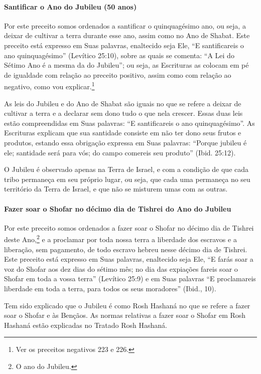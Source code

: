 \paragraph{Santificar o Ano do Jubileu (50 anos)}

Por este preceito somos ordenados a santificar o quinquagésimo ano, ou
seja, a deixar de cultivar a terra durante esse ano, assim como no Ano
de Shabat. Este preceito está expresso em Suas palavras, enaltecido seja
Ele, ``E santificareis o ano quinquagésimo'' (Levítico 25:10), sobre as
quais se comenta: ``A Lei do Sétimo Ano é a mesma da do Jubileu''; ou
seja, as Escrituras as colocam em pé de igualdade com relação ao preceito positivo, assim como com relação ao negativo, como vou explicar.\footnote{Ver os preceitos negativos 223 e 226.}

As leis do Jubileu e do Ano de Shabat são iguais no que se refere a
deixar de cultivar a terra e a declarar sem dono tudo o que nela crescer. Essas
duas leis estão compreendidas em Suas palavras: ``E santificareis o ano
quinquagésimo''. As Escrituras explicam que sua santidade consiste em
não ter dono seus frutos e produtos, estando essa obrigação expressa em
Suas palavras: ``Porque jubileu é ele; santidade será para vós; do
campo comereis seu produto'' (Ibid. 25:12).

O Jubileu é observado apenas na Terra de Israel, e com a condição de que
cada tribo permaneça em seu próprio lugar, ou seja, que cada uma
permaneça no seu território da Terra de Israel, e que não se misturem
umas com as outras.

\paragraph{Fazer soar o Shofar no décimo dia de Tishrei do Ano do Jubileu}

Por este preceito somos ordenados a fazer soar o Shofar no décimo
dia de Tishrei deste Ano,\footnote{O ano do Jubileu.} e a proclamar por
toda nossa terra a liberdade dos escravos e a liberação, sem pagamento,
de todo escravo hebreu nesse décimo dia de Tishrei. Este preceito
está expresso em Suas palavras, enaltecido seja Ele, ``E farás soar a
voz do Shofar aos dez dias do sétimo mês; no dia das expiações fareis
soar o Shofar em toda a vossa terra'' (Levítico 25:9) e em Suas
palavras ``E proclamareis liberdade em toda a terra, para todos os seus
moradores'' (Ibid., 10).

Tem sido explicado que o Jubileu é como Rosh Hashaná no que se refere a
fazer soar o Shofar e às Bençãos. As normas relativas a fazer soar o
Shofar em Rosh Hashaná estão explicadas no Tratado Rosh Hashaná.

